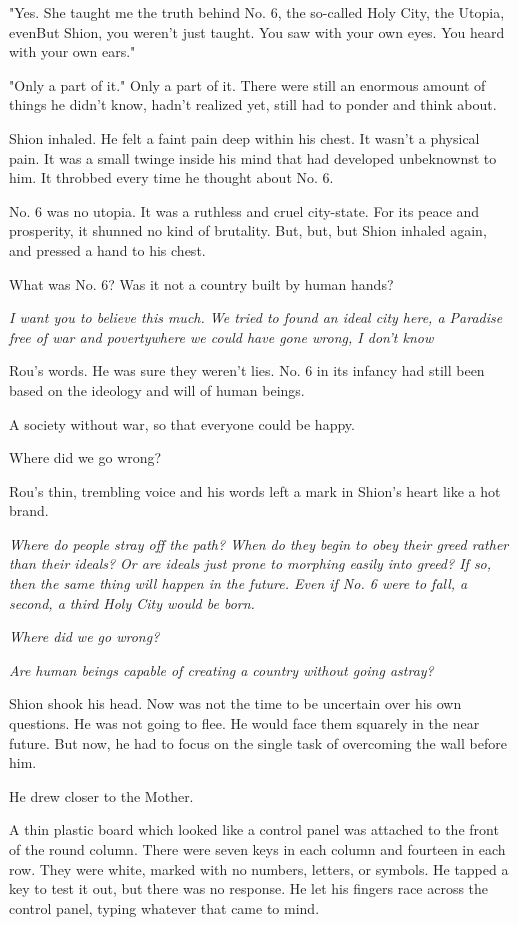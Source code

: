 "Yes. She taught me the truth behind No. 6, the so-called Holy City, the
Utopia, even\el But Shion, you weren't just taught. You saw with your
own eyes. You heard with your own ears."

"Only a part of it." Only a part of it. There were still an enormous
amount of things he didn't know, hadn't realized yet, still had to
ponder and think about.

Shion inhaled. He felt a faint pain deep within his chest. It wasn't a
physical pain. It was a small twinge inside his mind that had developed
unbeknownst to him. It throbbed every time he thought about No. 6.

No. 6 was no utopia. It was a ruthless and cruel city-state. For its
peace and prosperity, it shunned no kind of brutality. But, but, but\el 
Shion inhaled again, and pressed a hand to his chest.

What was No. 6? Was it not a country built by human hands?

\emph{I want you to believe this much. We tried to found an ideal city here, a
Paradise free of war and poverty\el where we could have gone wrong, I
don't know\el }

Rou's words. He was sure they weren't lies. No. 6 in its infancy had
still been based on the ideology and will of human beings.

A society without war, so that everyone could be happy.

Where did we go wrong?

Rou's thin, trembling voice and his words left a mark in Shion's heart
like a hot brand.

\emph{Where do people stray off the path? When do they begin to obey their
greed rather than their ideals? Or are ideals just prone to morphing
easily into greed? If so, then the same thing will happen in the future.
Even if No. 6 were to fall, a second, a third Holy City would be born.}

\emph{Where did we go wrong?}

\emph{Are human beings capable of creating a country without going astray?}

Shion shook his head. Now was not the time to be uncertain over his own
questions. He was not going to flee. He would face them squarely in the
near future. But now, he had to focus on the single task of overcoming
the wall before him.

He drew closer to the Mother.

A thin plastic board which looked like a control panel was attached to
the front of the round column. There were seven keys in each column and
fourteen in each row. They were white, marked with no numbers, letters,
or symbols. He tapped a key to test it out, but there was no response.
He let his fingers race across the control panel, typing whatever that
came to mind.

